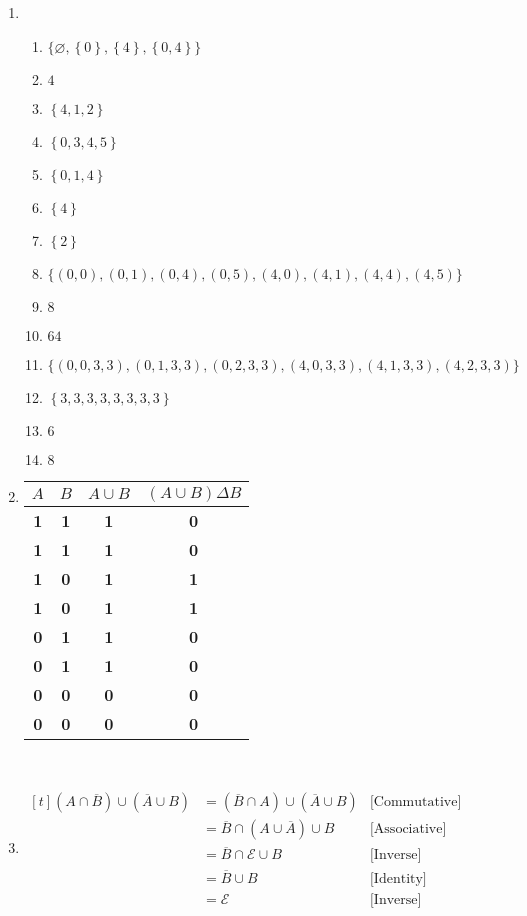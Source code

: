 \begin{enumerate}[leftmargin=2cm,labelsep=.5cm,label=\bf\arabic*.]
\item
\begin{enumerate}
  \item $\big\{\varnothing,\left\{0\right\},\left\{4\right\},\left\{0,4\right\} \big\}$
  \item $4$
  \item $\left\{4,1,2 \right\}$
  \item $\left\{0,3,4,5 \right\}$
  \item $\left\{0,1,4 \right\}$
  \item $\left\{4 \right\}$
  \item $\left\{2 \right\}$
  \item $\big\{\left(0,0\right),\left(0,1\right),\left(0,4\right),\left(0,5\right),\left(4,0\right),\left(4,1\right),\left(4,4\right),\left(4,5\right) \big\}$
  \item $8$
  \item $64$
  \item $\big\{\left(0,0,3,3\right),\left(0,1,3,3\right),\left(0,2,3,3\right),\left(4,0,3,3\right),\left(4,1,3,3\right),\left(4,2,3,3\right) \big\}$
  \item $\left\{3,3,3,3,3,3,3,3 \right\}$
  \item $6$
  \item $8$\\[5mm]
\end{enumerate}

\item
\begin{tabu}[t]{|c|c|c|c|}
\hline
$A$ & $B$ & $A\cup B$ & $(A\cup B)\Delta B$ \\ \hline
\textbf{1} & \textbf{1} & \textbf{1} & \textbf{0} \\ \hline
\textbf{1} & \textbf{1} & \textbf{1} & \textbf{0} \\ \hline
\textbf{1} & \textbf{0} & \textbf{1} & \textbf{1} \\ \hline
\textbf{1} & \textbf{0} & \textbf{1} & \textbf{1} \\ \hline
\textbf{0} & \textbf{1} & \textbf{1} & \textbf{0} \\ \hline
\textbf{0} & \textbf{1} & \textbf{1} & \textbf{0} \\ \hline
\textbf{0} & \textbf{0} & \textbf{0} & \textbf{0} \\ \hline
\textbf{0} & \textbf{0} & \textbf{0} & \textbf{0} \\ \hline
\end{tabu}\\[5mm]

\item $
\begin{aligned}[t]
(A \cap \overline{B}) \cup (\overline{A} \cup B) &= (\overline{B} \cap A) \cup (\overline{A} \cup B) & \text{[Commutative]}\\
&= \overline{B} \cap (A \cup \overline{A}) \cup B & \text{[Associative]}\\
&= \overline{B} \cap \mathscr{E} \cup B & \text{[Inverse]}\\
&= \overline{B} \cup B & \text{[Identity]}\\
&= \mathscr{E} & \text{[Inverse]}
\end{aligned} $
\end{enumerate}